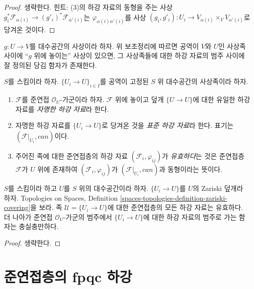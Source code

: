 \begin{proof}
생략한다. 힌트: (3)의 하강 자료의 동형을 주는 사상
$g_i^*\mathcal{F}_{\alpha(i)} \to (g'_i)^*\mathcal{F}_{\alpha'(i)}$는
$\varphi_{\alpha(i)\alpha'(i)}$를 사상
$(g_i,g'_i):U_i\to V_{\alpha(i)}\times_VV_{\alpha'(i)}$로 당겨온 것이다.
\end{proof}


\noindent
$g:U\to V$를 대수공간의 사상이라 하자. 위 보조정리에 따르면 공역이
$V$와 $U$인 사상족 사이에 ``$g$ 위에 놓이는'' 사상이 있으면, 그 사상족들에
대한 하강 자료의 범주 사이에 잘 정의된 당김 함자가 존재한다.

\begin{definition}
\label{definition-descent-datum-effective-quasi-coherent}
$S$를 스킴이라 하자. $\{U_i\to U\}_{i\in I}$를 공역이 고정된 $S$ 위
대수공간의 사상족이라 하자.
\begin{enumerate}
\item $\mathcal{F}$를 준연접 $\mathcal{O}_U$-가군이라 하자.
$\mathcal{F}$ 위에 놓이고 덮개 $\{U\to U\}$에 대한 유일한 하강 자료를
{\it 자명한 하강 자료}라 한다.
\item 자명한 하강 자료를 $\{U_i\to U\}$로 당겨온 것을
{\it 표준 하강 자료}라 한다. 표기는 $(\mathcal{F}|_{U_i},can)$이다.
\item 주어진 족에 대한 준연접층의 하강 자료
$(\mathcal{F}_i,\varphi_{ij})$가 {\it 유효하다}는 것은 준연접층
$\mathcal{F}$가 $U$ 위에 존재하여 $(\mathcal{F}_i,\varphi_{ij})$가
$(\mathcal{F}|_{U_i},can)$과 동형이라는 뜻이다.
\end{enumerate}
\end{definition}

\begin{lemma}
\label{lemma-zariski-descent-effective}
$S$를 스킴이라 하고 $U$를 $S$ 위의 대수공간이라 하자.
$\{U_i\to U\}$를 $U$의 Zariski 덮개라 하자. Topologies on Spaces,
Definition \ref{spaces-topologies-definition-zariski-covering}을 보라.
족 $\mathcal{U}=\{U_i\to U\}$에 대한 준연접층의 모든 하강 자료는
유효하다. 더 나아가 준연접 $\mathcal{O}_U$-가군의 범주에서
$\{U_i\to U\}$에 대한 하강 자료의 범주로 가는 함자는 충실충만하다.
\end{lemma}

\begin{proof}
생략한다.
\end{proof}

\section{준연접층의 fpqc 하강}
\label{section-fpqc-descent-quasi-coherent}

